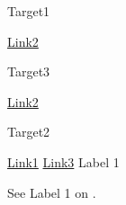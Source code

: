 \documentclass[12pt]{article}
\begin{document}
\thispagestyle{empty}

\hypertarget{ziel1}{Target1}
\hyperlink{ziel2}{Link2}
\vskip 2in\vfill\break

\hypertarget{ziel3}{Target3}
\hyperlink{ziel2}{Link2}
\vskip 2in\vfill\break

\hypertarget{ziel2}{Target2}
\hyperlink{ziel1}{Link1}
\hyperlink{ziel3}{Link3}
\label{label1}Label 1
\vskip 2in\vfill\break

See Label 1 on \pageref{label1}.
\end{document}
